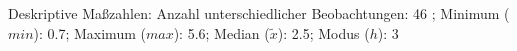 				\label{tableValues:asch04a}
				\vspace*{-\baselineskip}
                    \begin{noten}
                	    \note{} Deskriptive Maßzahlen:
                	    Anzahl unterschiedlicher Beobachtungen: 46%
                	    ; 
                	      Minimum ($min$): 0.7; 
                	      Maximum ($max$): 5.6; 
                	      Median ($\tilde{x}$): 2.5; 
                	      Modus ($h$): 3
                     \end{noten}


